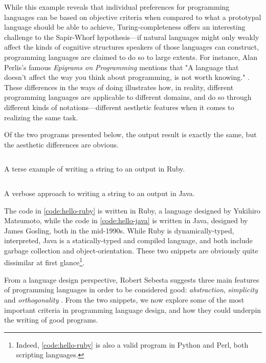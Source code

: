 While this example reveals that individual preferences for programming languages can be based on objective criteria when compared to what a prototypal language should be able to achieve, Turing-completeness offers an interesting challenge to the Sapir-Whorf hypothesis—if natural languages might only weakly affect the kinds of cognitive structures speakers of those languages can construct, programming languages are claimed to do so to large extents. For instance, Alan Perlis's famous \emph{Epigrams on Programming} mentions that "A language that doesn't affect the way you think about programming, is not worth knowing." \citep{perlis_special_1982}. These differences in the ways of doing illustrates how, in reality, different programming languages are applicable to different domains, and do so through different kinds of notations—different aesthetic features when it comes to realizing the same task.

Of the two programs presented below, the output result is exactly the same, but the aesthetic differences are obvious.

\begin{listing}
  \inputminted{ruby}{./corpus/hello.rb}
  \caption{A terse example of writing a string to an output in Ruby.}
  \label{code:hello-ruby}
\end{listing}

\begin{listing}
  \inputminted{java}{./corpus/hello.java}
  \caption{A verbose approach to writing a string to an output in Java.}
  \label{code:hello-java}
\end{listing}

The code in \ref{code:hello-ruby} is written in Ruby, a language designed by Yukihiro Matsumoto, while the code in \ref{code:hello-java} is written in Java, designed by James Gosling, both in the mid-1990s. While Ruby is dynamically-typed, interpreted, Java is a statically-typed and compiled language, and both include garbage collection and object-orientation. These two snippets are obviously quite dissimilar at first glance\footnote{Indeed, \ref{code:hello-ruby} is also a valid program in Python and Perl, both scripting languages.}.

From a language design perspective, Robert Sebesta suggests three main features of programming languages in order to be considered good: \emph{abstraction}, \emph{simplicity} and \emph{orthogonality} \citep{sebesta_concepts_2018}. From the two snippets, we now explore some of the most important criteria in programming language design, and how they could underpin the writing of good programs.

